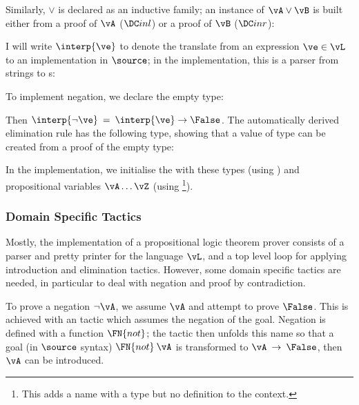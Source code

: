 Similarly, $\lor$ is declared as an inductive family; an instance of
$\vA\lor\vB$ is built either from a proof of $\vA$ ($\orintrol$) or a
proof of $\vB$ ($\orintror$):

\DM{
\AR{
\Data\:\Tor\:(\vA,\vB\Hab\Type)\Hab\Type\hg\Where\\
\hg\hg\ARd{
& \orintrol\Hab\fbind{\va}{\vA}{\Tor\:\vA\:\vB}\\
\mid & \orintror\Hab\fbind{\vb}{\vB}{\Tor\:\vA\:\vB}
}
}
}

I will write $\interp{\ve}$ to denote the translate from an expression
$\ve\in\vL$ to an implementation in $\source$; in the implementation,
this is a parser from strings to s:


To implement negation, we declare the empty type:

\DM{
\Data\:\False\Hab\Type\hg\Where
}

Then $\interp{\neg\ve}\:=\:\interp{\ve}\to\False$. The automatically
derived elimination rule has the following type, showing that a value
of  type can be created from a proof of the empty type:

\DM{
\Elim{\False}\Hab\fbind{\vx}{\False}{
\fbind{\motive}{\False\to\Type}{\motive\:\vx}}
}

In the implementation, we initialise the  with these
types (using ) and propositional variables
$\vA\ldots\vZ$ (using \footnote{This adds a name with
  a type but no definition to the context.}).

\subsubsection{Domain Specific Tactics}
Mostly, the implementation of a propositional logic theorem prover
consists of a parser and pretty printer for the language $\vL$, and a
top level loop for applying introduction and elimination
tactics. However, some domain
specific tactics are needed, in particular to deal with negation and
proof by contradiction. 

To prove a negation $\neg\vA$, we assume $\vA$ and attempt to prove
$\False$. This is achieved with an  tactic which
assumes the negation of the goal. Negation is defined with a function
$\FN{not}$; the  tactic then unfolds this name so
that a goal (in $\source$ syntax) $\FN{not}\:\vA$ is transformed to
$\vA\:\to\:\False$, then $\vA$ can be introduced.

